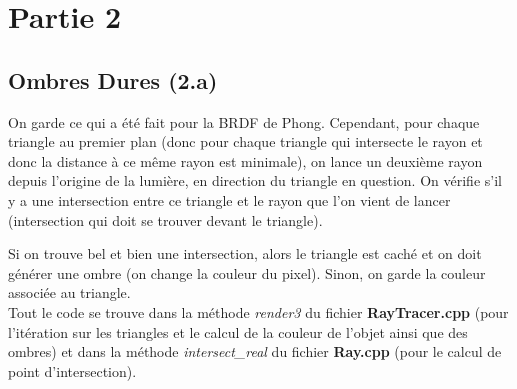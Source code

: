 \documentclass[a4paper,11pt,titlepage]{article}
\begin{document}
\section{Partie 2}

\subsection{Ombres Dures (2.a)}

On garde ce qui a été fait pour la BRDF de Phong. Cependant, pour chaque triangle au premier plan (donc pour chaque triangle qui intersecte le rayon et donc la distance à ce même rayon est minimale), on lance un deuxième rayon depuis l'origine de la lumière, en direction du triangle en question. On vérifie s'il y a une intersection entre ce triangle et le rayon que l'on vient de lancer (intersection qui doit se trouver devant le triangle).

Si on trouve bel et bien une intersection, alors le triangle est caché et on doit générer une ombre (on change la couleur du pixel). Sinon, on garde la couleur associée au triangle.\\

Tout le code se trouve dans la méthode \textit{render3} du fichier \textbf{RayTracer.cpp} (pour l'itération sur les triangles et le calcul de la couleur de l'objet ainsi que des ombres) et dans la méthode \textit{intersect\_real} du fichier \textbf{Ray.cpp} (pour le calcul de point d'intersection).
\end{document}
